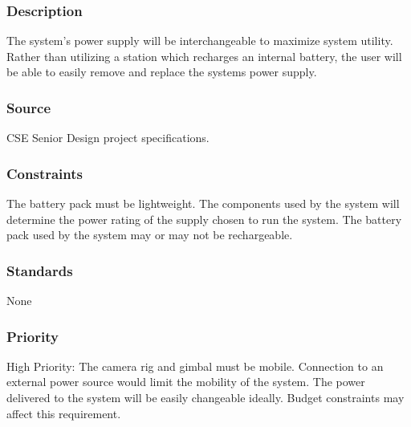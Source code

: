 \subsubsection{Description}
The system's power supply will be interchangeable to maximize system utility. Rather than utilizing a station which recharges an internal battery, the user will be able to easily remove and replace the systems power supply.  
\subsubsection{Source}
CSE Senior Design project specifications.
\subsubsection{Constraints}
The battery pack must be lightweight. The components used by the system will determine the power rating of the supply chosen to run the system. The battery pack used by the system may or may not be rechargeable.
\subsubsection{Standards}
None
\subsubsection{Priority}
High Priority: The camera rig and gimbal must be mobile. Connection to an external power source would limit the mobility of the system. The power delivered to the system will be easily changeable ideally. Budget constraints may affect this requirement.

